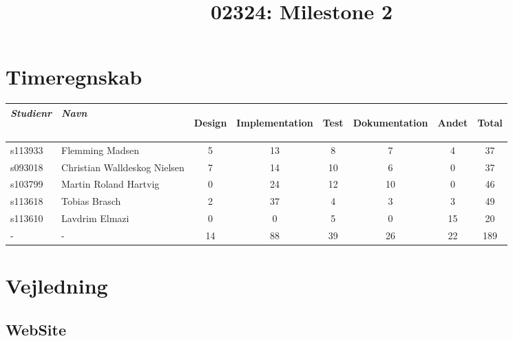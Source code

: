 \documentclass[a4paper]{article}
\title{02324: Milestone 2}
\author{
}
\begin{document}
\tableofcontents

\vspace{5cm}

\section{Timeregnskab} %
\label{sec:Timeregnskab}
\begin{tabular}{l l | c c c c c | c}

  \emph{Studienr} & \emph{Navn}
  & \begin{sideways}Design\end{sideways} 
  & \begin{sideways}Implementation\end{sideways} 
  & \begin{sideways}Test\end{sideways} 
  & \begin{sideways}Dokumentation\end{sideways} 
  & \begin{sideways}Andet\end{sideways} 
  & \begin{sideways}Total\end{sideways} \\
  \hline
  s113933 & Flemming Madsen              & 5 & 13 & 8  & 7 & 4  & 37 \\
  s093018 & Christian Walldeskog Nielsen & 7 & 14 & 10 & 6 & 0  & 37 \\
  s103799 & Martin Roland Hartvig        & 0 & 24 & 12 & 10 & 0 & 46 \\
  s113618 & Tobias Brasch                & 2 & 37 & 4  & 3 & 3  & 49 \\
  s113610 & Lavdrim Elmazi               & 0 & 0  & 5  & 0 & 15 & 20 \\
  \hline
  -       & -                            & 14 & 88 & 39 & 26 & 22 & 189
  
\end{tabular}


\clearpage

\section{Vejledning} %
\label{sec:Vejledning}

\subsection*{WebSite} %
\label{sub:WebSite}
\end{document}
